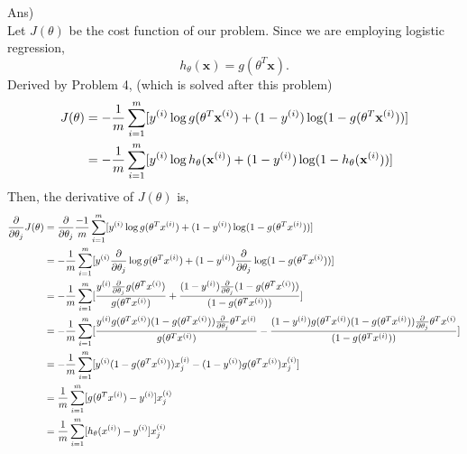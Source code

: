 \documentclass[12pt]{article}%
\begin{document}
Ans) \\
Let $J(\theta)$ be the cost function of our problem. Since we are employing logistic regression, 
\begin{equation}
	h_\theta (\mathbf{x}) = g(\theta^T \mathbf{x}).
\end{equation}
Derived by Problem 4, (which is solved after this problem)
\begin{equation}
	\begin{aligned}
		J(\theta) & = - {1 \over m } \sum_{i=1}^{m} [y^{(i)} \log g(\theta^T \mathbf{x}^{(i)}) + (1 - y^{(i)})\log(1 - g(\theta^T \mathbf{x}^{(i)}))] \\
		& = - {1 \over m } \sum_{i=1}^{m} [y^{(i)} \log h_\theta (\mathbf{x}^{(i)}) + (1 - y^{(i)})\log (1 - h_\theta (\mathbf{x}^{(i)}))]
	\end{aligned}
\end{equation}
Then, the derivative of $J(\theta)$ is, 
\begin{equation}
	\begin{aligned}
		{\partial \over {\partial \theta_j}} J(\theta) & = {\partial \over {\partial \theta_j}} {-1 \over m} \sum_{i=1}^{m} [y^{(i)} \log g(\theta^T x^{(i)}) + (1 - y^{(i)})\log(1 - g(\theta^T x^{(i)}))] \\
		& =- {1 \over m} \sum_{i=1}^{m} [y^{(i)} {\partial \over {\partial \theta_j}} \log g(\theta^T x^{(i)}) + (1 - y^{(i)}) {\partial \over {\partial \theta_j}}\log(1 - g(\theta^T x^{(i)}))] \\
		& = - {1 \over m} \sum_{i=1}^{m} [{{ y^{(i)}{\partial \over {\partial \theta_j}} g(\theta^T x^{(i)})} \over {g(\theta^T x^{(i)})}} + {{ (1-y^{(i)}){\partial \over {\partial \theta_j}} (1-g(\theta^T x^{(i)}))} \over {(1-g(\theta^T x^{(i)}))}}] \\
		& = - {1 \over m} \sum_{i=1}^{m} [{ y^{(i)} g(\theta^T x^{(i)})(1 - g(\theta^T x^{(i)})){\partial \over {\partial \theta_j}} \theta^T x^{(i)} \over {g(\theta^T x^{(i)})}} - {{(1-y^{(i)}) g(\theta^T x^{(i)})(1-g(\theta^T x^{(i)}))}{\partial \over {\partial \theta_j}} \theta^T x^{(i)} \over {(1-g(\theta^T x^{(i)}))}}] \\
		& = - {1 \over m} \sum_{i=1}^{m} [y^{(i)}(1 - g(\theta^T x^{(i)}))x_j^{(i)} - (1 - y^{(i)})g(\theta^T x^{(i)})x_j^{(i)}]\\
		& = {1 \over m} \sum_{i=1}^{m} [g(\theta^T x^{(i)}) - y^{(i)}]x_j^{(i)}\\
		& = {1 \over m} \sum_{i=1}^{m} [h_\theta (x^{(i)}) - y^{(i)}]x_j^{(i)}
	\end{aligned}
\end{equation}
\end{document}
